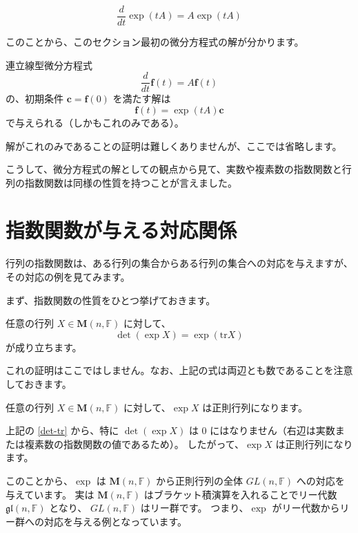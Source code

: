 \documentclass[a5paper]{ltjsarticle}
\begin{document}
\begin{usmproposition}
    \[
        \frac{d}{dt} \exp (tA) = A \exp (tA)
    \]
\end{usmproposition}

このことから、このセクション最初の微分方程式の解が分かります。

\begin{usmproposition}
    連立線型微分方程式
    \[
        \frac{d}{dt} \boldsymbol{f}(t) = A \boldsymbol{f}(t)
    \]
    の、初期条件 \(\boldsymbol{c} = \boldsymbol{f}(0)\) を満たす解は
    \[
        \boldsymbol{f}(t) = \exp (tA) \boldsymbol{c}
    \]
    で与えられる（しかもこれのみである）。
\end{usmproposition}

解がこれのみであることの証明は難しくありませんが、ここでは省略します。

こうして、微分方程式の解としての観点から見て、実数や複素数の指数関数と行列の指数関数は同様の性質を持つことが言えました。

\section{指数関数が与える対応関係}

行列の指数関数は、ある行列の集合からある行列の集合への対応を与えますが、その対応の例を見てみます。

まず、指数関数の性質をひとつ挙げておきます。

\begin{usmproposition}\label{det-tr}
    任意の行列 \(X \in \mathbf{M}(n,\mathbb{F})\) に対して、
    \[
        \det (\exp X) = \exp (\mathrm{tr} X)
    \]
    が成り立ちます。
\end{usmproposition}

これの証明はここではしません。なお、上記の式は両辺とも数であることを注意しておきます。

\begin{usmproposition}[正則性]
    任意の行列 \(X \in \mathbf{M}(n,\mathbb{F})\) に対して、\(\exp X\) は正則行列になります。
\end{usmproposition}
\begin{usmproof}
    上記の \autoref{det-tr} から、特に \(\det (\exp X)\) は \(0\) にはなりません（右辺は実数または複素数の指数関数の値であるため）。
    したがって、\(\exp X\) は正則行列になります。
\end{usmproof}

このことから、\(\exp \) は \(\mathbf{M}(n,\mathbb{F})\) から正則行列の全体 \(\mathit{GL}(n,\mathbb{F})\) への対応を与えています。
実は \(\mathbf{M}(n,\mathbb{F})\) はブラケット積演算を入れることでリー代数 \(\mathfrak{gl}(n,\mathbb{F})\) となり、
\(\mathit{GL}(n,\mathbb{F})\) はリー群です。
つまり、\(\exp \) がリー代数からリー群への対応を与える例となっています。
\end{document}

